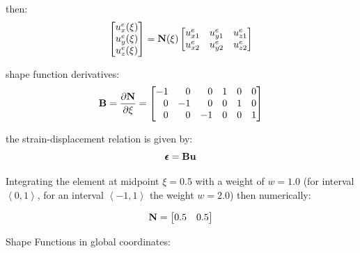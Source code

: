 then:
\begin{equation}
    \begin{bmatrix}
        u_x^e(\xi) \\
        u_y^e(\xi) \\
        u_z^e(\xi) \\
    \end{bmatrix}
    = \mathbf{N}(\xi) \begin{bmatrix}
        u_{x1}^e & u_{y1}^e& u_{z1}^e \\
        u_{x2}^e & u_{y2}^e& u_{z2}^e \\
    \end{bmatrix}
\end{equation}

shape function derivatives:
\begin{equation}
    \mathbf{B} = \frac{\partial \mathbf{N}}{\partial \xi} =
    \begin{bmatrix}
        -1 & \phantom{-}0 & \phantom{-}0 & 1 & 0 & 0 \\
        \phantom{-}0 & -1 & \phantom{-}0 & 0 & 1 & 0  \\
        \phantom{-}0 & \phantom{-}0 & -1 & 0 & 0 & 1  \\
    \end{bmatrix}
\end{equation}

the strain-displacement relation is given by:
\begin{equation}
    \pmb{\epsilon} = \mathbf{B} \mathbf{u}
\end{equation}

Integrating the element at midpoint $ \xi = 0.5 $ with a weight of $ w = 1.0 $
(for interval $ \left< 0, 1 \right> $, for an interval
$ \left< -1,  1 \right> $ the weight $ w = 2.0 $)
then numerically:

\begin{equation}
    \mathbf{N} = \begin{bmatrix}
        0.5 & 0.5 \\
    \end{bmatrix}
\end{equation}

Shape Functions in global coordinates:

